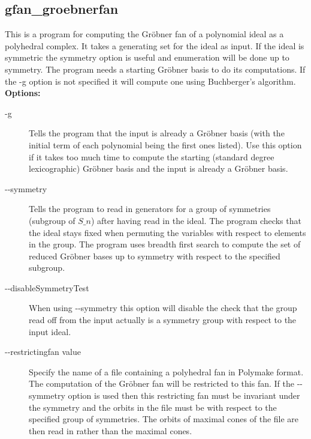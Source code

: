 {{{{{{{{{{{{{\subsection{gfan\_groebnerfan}\label{applist:_groebnerfan}
This is a program for computing the Gr\"obner fan of a polynomial ideal as a polyhedral complex. It takes a generating set for the ideal as input. If the ideal is symmetric the symmetry option is useful and enumeration will be done up to symmetry. The program needs a starting Gr\"obner basis to do its computations. If the -g option is not specified it will compute one using Buchberger's algorithm.
\newline
{\bf Options:}
\begin{description}
\item[-g]Tells the program that the input is already a Gr\"obner basis (with the initial term of each polynomial being the first ones listed). Use this option if it takes too much time to compute the starting (standard degree lexicographic) Gr\"obner basis and the input is already a Gr\"obner basis.
\item[-\hspace{0.013cm}-symmetry]Tells the program to read in generators for a group of symmetries (subgroup of $S\_n$) after having read in the ideal. The program checks that the ideal stays fixed when permuting the variables with respect to elements in the group. The program uses breadth first search to compute the set of reduced Gr\"obner bases up to symmetry with respect to the specified subgroup.
\item[-\hspace{0.013cm}-disableSymmetryTest]When using -\hspace{0.013cm}-symmetry this option will disable the check that the group read off from the input actually is a symmetry group with respect to the input ideal.
\item[-\hspace{0.013cm}-restrictingfan value]Specify the name of a file containing a polyhedral fan in Polymake format. The computation of the Gr\"obner fan will be restricted to this fan. If the -\hspace{0.013cm}-symmetry option is used then this restricting fan must be invariant under the symmetry and the orbits in the file must be with respect to the specified group of symmetries. The orbits of maximal cones of the file are then read in rather than the maximal cones.

\end{description}}}}}}}}}}}}}}
